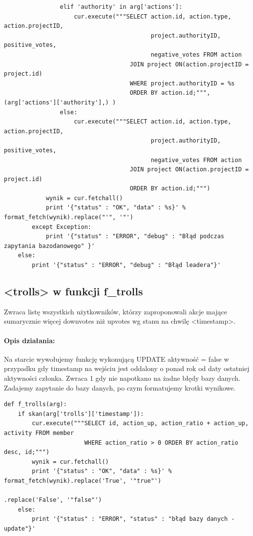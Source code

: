 \documentclass{article}
\begin{document}
\begin{verbatim}
                elif 'authority' in arg['actions']:
                    cur.execute("""SELECT action.id, action.type, action.projectID,
                                          project.authorityID, positive_votes,
                                          negative_votes FROM action
                                    JOIN project ON(action.projectID = project.id)
                                    WHERE project.authorityID = %s
                                    ORDER BY action.id;""", (arg['actions']['authority'],) )
                else:
                    cur.execute("""SELECT action.id, action.type, action.projectID,
                                          project.authorityID, positive_votes,
                                          negative_votes FROM action
                                    JOIN project ON(action.projectID = project.id)
                                    ORDER BY action.id;""")
            wynik = cur.fetchall()
            print '{"status" : "OK", "data" : %s}' % format_fetch(wynik).replace("'", '"')
        except Exception:
            print '{"status" : "ERROR", "debug" : "Błąd podczas zapytania bazodanowego" }' 
    else:
        print '{"status" : "ERROR", "debug" : "Błąd leadera"}'   
\end{verbatim}









\newpage
\subsection{<trolls> w funkcji f\_trolls }
Zwraca listę wszystkich użytkowników, którzy zaproponowali akcje mające sumarycznie więcej downvotes niż upvotes wg stanu na chwilę <timestamp>.
\paragraph{Opis działania: }
Na starcie wywołujemy funkcję wykonującą UPDATE aktywność = false w\,przypadku gdy timestamp na wejściu jest oddalony o ponad rok od daty ostatniej aktywności członka. Zwraca 1 gdy nie napotkano na żadne błędy bazy danych. Zadajemy zapytanie do bazy danych, po czym formatujemy krotki wynikowe.
\begin{verbatim}
def f_trolls(arg):
    if skan(arg['trolls']['timestamp']):                                                  
        cur.execute("""SELECT id, action_up, action_ratio + action_up, activity FROM member
                       WHERE action_ratio > 0 ORDER BY action_ratio desc, id;""")
        wynik = cur.fetchall()
        print '{"status" : "OK", "data" : %s}' % format_fetch(wynik).replace('True', '"true"')
                                                                    .replace('False', '"false"')    
    else:
        print '{"status" : "ERROR", "status" : "błąd bazy danych - update"}' 
\end{verbatim}
\end{document}
